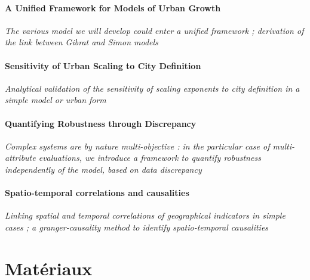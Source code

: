 


\subsection{A Unified Framework for Models of Urban Growth}

\textit{The various model we will develop could enter a unified framework ; derivation of the link between Gibrat and Simon models}


\subsection{Sensitivity of Urban Scaling to City Definition}

\textit{Analytical validation of the sensitivity of scaling exponents to city definition in a simple model or urban form}

\subsection{Quantifying Robustness through Discrepancy}

\textit{Complex systems are by nature multi-objective : in the particular case of multi-attribute evaluations, we introduce a framework to quantify robustness independently of the model, based on data discrepancy~\cite{raimbault2016discrepancy}}


\subsection{Spatio-temporal correlations and causalities}

\textit{Linking spatial and temporal correlations of geographical indicators in simple cases ; a granger-causality method to identify spatio-temporal causalities}








\part{Matériaux}

